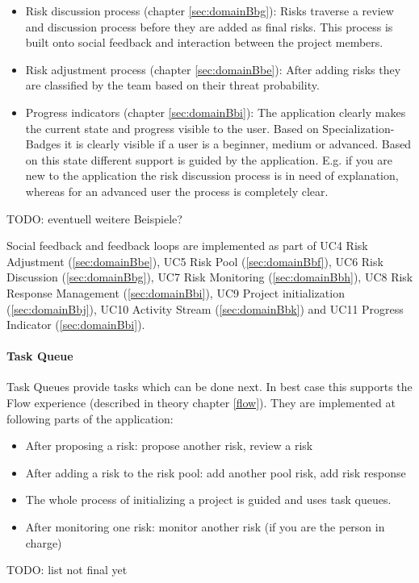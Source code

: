 \begin{itemize}
	\item Risk discussion process (chapter \ref{sec:domainBbg}): Risks traverse a review and discussion process before they are added as final risks. This process is built onto social feedback and interaction between the project members.
	\item Risk adjustment process (chapter \ref{sec:domainBbe}): After adding risks they are classified by the team based on their threat probability.
	\item Progress indicators (chapter \ref{sec:domainBbi}): The application clearly makes the current state and progress visible to the user. Based on Specialization-Badges it is clearly visible if a user is a beginner, medium or advanced. Based on this state different support is guided by the application. E.g. if you are new to the application the risk discussion process is in need of explanation, whereas for an advanced user the process is completely clear.
\end{itemize}

TODO: eventuell weitere Beispiele?

Social feedback and feedback loops are implemented as part of \ac{UC}4 Risk Adjustment (\ref{sec:domainBbe}), \ac{UC}5 Risk Pool (\ref{sec:domainBbf}), \ac{UC}6 Risk Discussion (\ref{sec:domainBbg}), \ac{UC}7 Risk Monitoring (\ref{sec:domainBbh}), \ac{UC}8 Risk Response Management (\ref{sec:domainBbi}), \ac{UC}9 Project initialization (\ref{sec:domainBbj}), \ac{UC}10 Activity Stream (\ref{sec:domainBbk}) and \ac{UC}11 Progress Indicator (\ref{sec:domainBbi}).

\paragraph*{Task Queue}

Task Queues provide tasks which can be done next. In best case this supports the Flow experience (described in theory chapter \ref{flow}).
They are implemented at following parts of the application:
\begin{itemize}
	\item After proposing a risk: propose another risk, review a risk
	\item After adding a risk to the risk pool: add another pool risk, add risk response
	\item The whole process of initializing a project is guided and uses task queues.
	\item After monitoring one risk: monitor another risk (if you are the person in charge)
\end{itemize}
TODO: list not final yet

